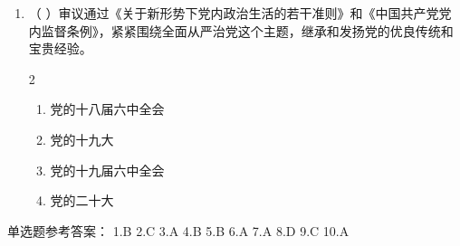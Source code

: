 \documentclass[a4paper,11pt]{ctexart}
\begin{document}
\begin{enumerate}
    \item （ ）审议通过《关于新形势下党内政治生活的若干准则》和《中国共产党党内监督条例》，紧紧围绕全面从严治党这个主题，继承和发扬党的优良传统和宝贵经验。
    \begin{multicols}{2}
    \begin{enumerate}
        \item 党的十八届六中全会
        \item 党的十九大
        \item 党的十九届六中全会
        \item 党的二十大
    \end{enumerate}
    \end{multicols}
\end{enumerate}

\begin{answerbox}
单选题参考答案：
1.B \quad 2.C \quad 3.A \quad 4.B \quad 5.B \quad 6.A \quad 7.A \quad 8.D \quad 9.C \quad 10.A
\end{answerbox}
\end{document}
